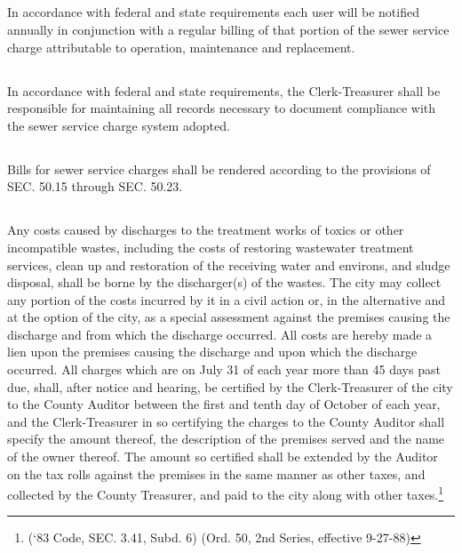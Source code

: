 \subsection{}
In accordance with federal and state requirements each user will be notified annually in conjunction with a regular billing of that portion of the sewer service charge attributable to operation, maintenance and replacement.
\subsection{}
In accordance with federal and state requirements, the Clerk-Treasurer shall be responsible for maintaining all records necessary to document compliance with the sewer service charge system adopted.
\subsection{}
Bills for sewer service charges shall be rendered according to the provisions of SEC. 50.15 through SEC. 50.23.
\subsection{}
Any costs caused by discharges to the treatment works of toxics or other incompatible wastes, including the costs of restoring wastewater treatment services, clean up and restoration of the receiving water and environs, and sludge disposal, shall be borne by the discharger(s) of the wastes.  The city may collect any portion of the costs incurred by it in a civil action or, in the alternative and at the option of the city, as a special assessment against the premises causing the discharge and from which the discharge occurred. All costs are hereby made a lien upon the premises causing the discharge and upon which the discharge occurred. All charges which are on July 31 of each year more than 45 days past due, shall, after notice and hearing, be certified by the Clerk-Treasurer of the city to the County Auditor between the first and tenth day of October of each year, and the Clerk-Treasurer in so certifying the charges to the County Auditor shall specify the amount thereof, the description of the premises served and the name of the owner thereof. The amount so certified shall be extended by the Auditor on the tax rolls against the premises in the same manner as other taxes, and collected by the County Treasurer, and paid to the city along with other taxes.\footnote{(‘83 Code, SEC. 3.41, Subd. 6) (Ord. 50, 2nd Series, effective 9-27-88)}\\


